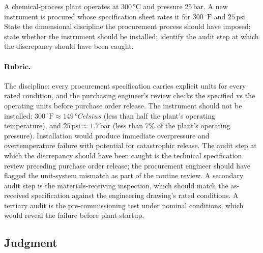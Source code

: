 \begin{exercise}
A chemical-process plant operates at $300 \,\si{\degreeCelsius}$ and
pressure $25\,\text{bar}$. A new instrument is procured whose
specification sheet rates it for $300\,{}^{\circ}\mathrm{F}$ and
$25\,\text{psi}$. State
the dimensional discipline the procurement process should have
imposed; state whether the instrument should be installed; identify
the audit step at which the discrepancy should have been caught.

\paragraph{Rubric.} The discipline: every procurement specification
carries explicit units for every rated condition, and the
purchasing engineer's review checks the specified vs the operating
units before purchase order release. The instrument should not be
installed: $300 \,{}^{\circ}\mathrm{F} \approx 149 \,\si{\degree
Celsius}$ (less than half the plant's operating temperature), and
$25 \,\text{psi} \approx 1.7 \,\text{bar}$ (less than 7\% of the
plant's operating pressure). Installation would produce immediate
overpressure and overtemperature failure with potential for
catastrophic release. The audit step at which the discrepancy
should have been caught is the technical specification review
preceding purchase order release; the procurement engineer should
have flagged the unit-system mismatch as part of the routine
review. A secondary audit step is the materials-receiving
inspection, which should match the as-received specification
against the engineering drawing's rated conditions. A tertiary
audit is the pre-commissioning test under nominal conditions, which
would reveal the failure before plant startup.
\end{exercise}

\subsection*{Judgment}

